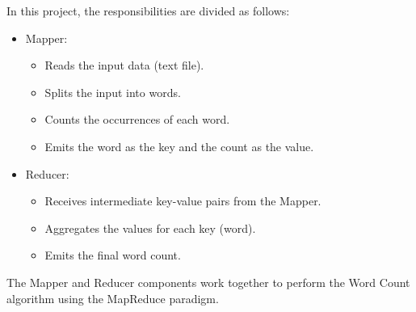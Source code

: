 \documentclass{article}
\begin{document}
In this project, the responsibilities are divided as follows:

\begin{itemize}
  \item Mapper:
  \begin{itemize}
    \item Reads the input data (text file).
    \item Splits the input into words.
    \item Counts the occurrences of each word.
    \item Emits the word as the key and the count as the value.
  \end{itemize}
  \item Reducer:
  \begin{itemize}
    \item Receives intermediate key-value pairs from the Mapper.
    \item Aggregates the values for each key (word).
    \item Emits the final word count.
  \end{itemize}
\end{itemize}

The Mapper and Reducer components work together to perform the Word Count algorithm using the MapReduce paradigm.
\end{document}
